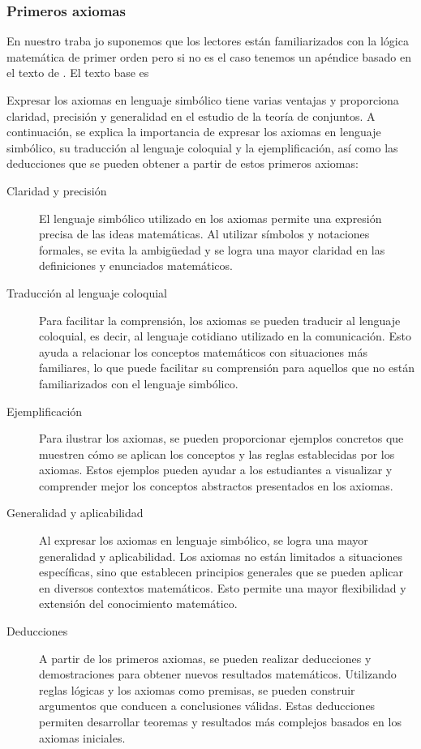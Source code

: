 \subsubsection{Primeros axiomas}

En nuestro traba jo suponemos que los lectores están familiarizados con la lógica matemática de primer orden pero si no es el caso tenemos un apéndice basado en el texto de \textcite{margaris1990first}. El texto base es \textcite{cignoli2016teoriaconj}

Expresar los axiomas en lenguaje simbólico tiene varias ventajas y proporciona claridad, precisión y generalidad en el estudio de la teoría de conjuntos. A continuación, se explica la importancia de expresar los axiomas en lenguaje simbólico, su traducción al lenguaje coloquial y la ejemplificación, así como las deducciones que se pueden obtener a partir de estos primeros axiomas:
\begin{description}
	\item[Claridad y precisión] El lenguaje simbólico utilizado en los axiomas permite una expresión precisa de las ideas matemáticas. Al utilizar símbolos y notaciones formales, se evita la ambigüedad y se logra una mayor claridad en las definiciones y enunciados matemáticos.
	
	\item[Traducción al lenguaje coloquial] Para facilitar la comprensión, los axiomas se pueden traducir al lenguaje coloquial, es decir, al lenguaje cotidiano utilizado en la comunicación. Esto ayuda a relacionar los conceptos matemáticos con situaciones más familiares, lo que puede facilitar su comprensión para aquellos que no están familiarizados con el lenguaje simbólico.
	
	\item [Ejemplificación] Para ilustrar los axiomas, se pueden proporcionar ejemplos concretos que muestren cómo se aplican los conceptos y las reglas establecidas por los axiomas. Estos ejemplos pueden ayudar a los estudiantes a visualizar y comprender mejor los conceptos abstractos presentados en los axiomas.
	
	\item[Generalidad y aplicabilidad] Al expresar los axiomas en lenguaje simbólico, se logra una mayor generalidad y aplicabilidad. Los axiomas no están limitados a situaciones específicas, sino que establecen principios generales que se pueden aplicar en diversos contextos matemáticos. Esto permite una mayor flexibilidad y extensión del conocimiento matemático.
	
	\item[Deducciones] A partir de los primeros axiomas, se pueden realizar deducciones y demostraciones para obtener nuevos resultados matemáticos. Utilizando reglas lógicas y los axiomas como premisas, se pueden construir argumentos que conducen a conclusiones válidas. Estas deducciones permiten desarrollar teoremas y resultados más complejos basados en los axiomas iniciales.
\end{description}

